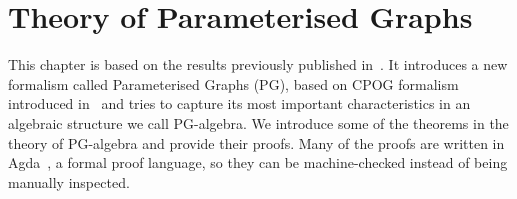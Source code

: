 

\usepackage{amstext}
\usepackage{amssymb}
\usepackage{stmaryrd}


\newcommand{\redFG}[1]{\textcolor[rgb]{0.6,0,0}{#1}}
\newcommand{\greenFG}[1]{\textcolor[rgb]{0,0.4,0}{#1}}
\newcommand{\blueFG}[1]{\textcolor[rgb]{0,0,0.8}{#1}}
\newcommand{\orangeFG}[1]{\textcolor[rgb]{0.8,0.4,0}{#1}}
\newcommand{\purpleFG}[1]{\textcolor[rgb]{0.4,0,0.4}{#1}}
\newcommand{\yellowFG}[1]{\textcolor{yellow}{#1}}
\newcommand{\brownFG}[1]{\textcolor[rgb]{0.5,0.2,0.2}{#1}}
\newcommand{\blackFG}[1]{\textcolor[rgb]{0,0,0}{#1}}
\newcommand{\whiteFG}[1]{\textcolor[rgb]{1,1,1}{#1}}
\newcommand{\yellowBG}[1]{\colorbox[rgb]{1,1,0.2}{#1}}
\newcommand{\brownBG}[1]{\colorbox[rgb]{1.0,0.7,0.4}{#1}}

\newcommand{\ColourStuff}{
  \newcommand{\red}{\redFG}
  \newcommand{\green}{\greenFG}
  \newcommand{\blue}{\blueFG}
  \newcommand{\orange}{\orangeFG}
  \newcommand{\purple}{\purpleFG}
  \newcommand{\yellow}{\yellowFG}
  \newcommand{\brown}{\brownFG}
  \newcommand{\black}{\blackFG}
  \newcommand{\white}{\whiteFG}
}

\newcommand{\MonochromeStuff}{
  \newcommand{\red}{\blackFG}
  \newcommand{\green}{\blackFG}
  \newcommand{\blue}{\blackFG}
  \newcommand{\orange}{\blackFG}
  \newcommand{\purple}{\blackFG}
  \newcommand{\yellow}{\blackFG}
  \newcommand{\brown}{\blackFG}
  \newcommand{\black}{\blackFG}
  \newcommand{\white}{\blackFG}
}

\ColourStuff

\newcommand{\K}[1]{\yellow{\mathsf{#1}}}
\newcommand{\Q}[1]{\green{\mathsf{#1}}}
\newcommand{\D}[1]{\blue{\mathsf{#1}}}
\newcommand{\C}[1]{\red{\mathsf{#1}}}
\newcommand{\F}[1]{\green{\mathsf{#1}}}
\newcommand{\V}[1]{\purple{\mathit{#1}}}

\newcommand{\dfeq}{\overset{\mathrm{df}}{=}}


\chapter{Theory of Parameterised Graphs}

This chapter is based on the results previously published in~\cite{pg_algebra}. 
It introduces a new formalism called Parameterised Graphs (PG), 
based on CPOG formalism introduced in~\cite{2010_mokhov_ieee} and tries to capture its 
most important characteristics in an algebraic structure we call PG-algebra.
We introduce some of the theorems in the theory of PG-algebra and provide their proofs.
Many of the proofs are written in Agda~\cite{norell:thesis}, a formal proof language,
so they can be machine-checked instead of being manually inspected.

